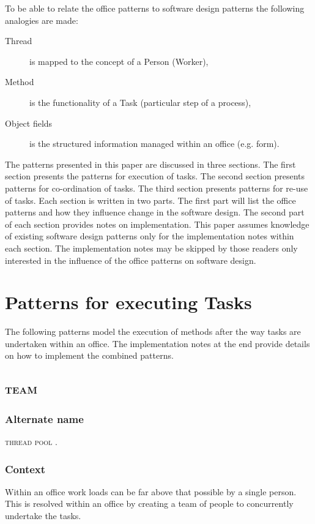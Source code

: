 \documentclass[prodmode]{style/acmlarge}
\begin{document}
To be able to relate the office patterns to software design patterns the
following analogies are made:
\begin{description}
  \item[Thread] is mapped to the concept of a Person (Worker),
  \item[Method] is the functionality of a Task (particular step of a process),
  \item[Object fields] is the structured information managed within an office (e.g. form).
\end{description}

The patterns presented in this paper are discussed in three sections.  The first
section presents the patterns for execution of tasks.  The second section
presents patterns for co-ordination of tasks.  The third section presents
patterns for re-use of tasks.  Each section is written in two parts.  The first
part will list the office patterns and how they influence change in the software
design.  The second part of each section provides notes on implementation.  This
paper assumes knowledge of existing software design patterns only for the
implementation notes within each section.  The implementation notes may be
skipped by those readers only interested in the influence of the office patterns
on software design.



\section{Patterns for executing Tasks}

The following patterns model the execution of methods after the way tasks are
undertaken within an office.  The implementation notes at the end provide
details on how to implement the combined patterns.


\subsection{\textsc{\textbf{team}}}

\subsubsection*{Alternate name} \textsc{thread pool} \cite{thread-per-request}.

\subsubsection*{Context} Within an office work loads can be far above that
possible by a single person. This is resolved within an office by creating a
team of people to concurrently undertake the tasks.
\end{document}

